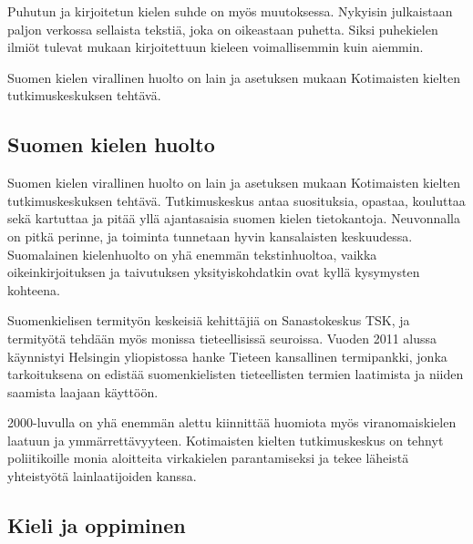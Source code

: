 \documentclass[]{../../metanetpaper}
\begin{document}
\begin{multicols}{2}
Puhutun ja kirjoitetun kielen suhde on myös muutoksessa. Nykyisin julkaistaan
paljon verkossa sellaista tekstiä, joka on oikeastaan puhetta. Siksi puhekielen
ilmiöt tulevat mukaan kirjoitettuun kieleen voimallisemmin kuin aiemmin.

Suomen kielen virallinen huolto on lain ja asetuksen mukaan Kotimaisten kielten
tutkimuskeskuksen tehtävä.


\subsection{Suomen kielen huolto}

Suomen kielen virallinen huolto on lain ja asetuksen mukaan Kotimaisten kielten
tutkimuskeskuksen tehtävä. Tutkimuskeskus antaa suosituksia, opastaa, kouluttaa
sekä kartuttaa ja pitää yllä ajantasaisia suomen kielen tietokantoja.
Neuvonnalla on pitkä perinne, ja toiminta tunnetaan hyvin kansalaisten
keskuudessa. Suomalainen kielenhuolto on yhä enemmän tekstinhuoltoa, vaikka
oikeinkirjoituksen ja taivutuksen yksityiskohdatkin ovat kyllä kysymysten
kohteena.

Suomenkielisen termityön keskeisiä kehittäjiä on Sanastokeskus TSK, ja
termityötä tehdään myös monissa tieteellisissä seuroissa. Vuoden 2011 alussa
käynnistyi Helsingin yliopistossa hanke Tieteen kansallinen termipankki, jonka
tarkoituksena on edistää suomenkielisten tieteellisten termien laatimista ja
niiden saamista laajaan käyttöön.

2000-luvulla on yhä enemmän alettu kiinnittää huomiota myös viranomaiskielen
laatuun ja ymmärrettävyyteen. Kotimaisten kielten tutkimuskeskus on tehnyt
poliitikoille monia aloitteita virkakielen parantamiseksi ja tekee läheistä
yhteistyötä lainlaatijoiden kanssa.


\subsection{Kieli ja oppiminen}



\end{multicols}
\end{document}

